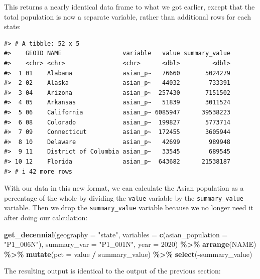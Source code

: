 \documentclass[
]{book}
\newenvironment{Shaded}{\begin{snugshade}}{\end{snugshade}}
\newcommand{\AttributeTok}[1]{\textcolor[rgb]{0.13,0.29,0.53}{#1}}
\newcommand{\DecValTok}[1]{\textcolor[rgb]{0.00,0.00,0.81}{#1}}
\newcommand{\FunctionTok}[1]{\textcolor[rgb]{0.13,0.29,0.53}{\textbf{#1}}}
\newcommand{\NormalTok}[1]{#1}
\newcommand{\SpecialCharTok}[1]{\textcolor[rgb]{0.81,0.36,0.00}{\textbf{#1}}}
\newcommand{\StringTok}[1]{\textcolor[rgb]{0.31,0.60,0.02}{#1}}
\begin{document}
This returns a nearly identical data frame to what we got earlier, except that the total population is now a separate variable, rather than additional rows for each state:

\begin{verbatim}
#> # A tibble: 52 x 5
#>    GEOID NAME                 variable   value summary_value
#>    <chr> <chr>                <chr>      <dbl>         <dbl>
#>  1 01    Alabama              asian_p~   76660       5024279
#>  2 02    Alaska               asian_p~   44032        733391
#>  3 04    Arizona              asian_p~  257430       7151502
#>  4 05    Arkansas             asian_p~   51839       3011524
#>  5 06    California           asian_p~ 6085947      39538223
#>  6 08    Colorado             asian_p~  199827       5773714
#>  7 09    Connecticut          asian_p~  172455       3605944
#>  8 10    Delaware             asian_p~   42699        989948
#>  9 11    District of Columbia asian_p~   33545        689545
#> 10 12    Florida              asian_p~  643682      21538187
#> # i 42 more rows
\end{verbatim}

With our data in this new format, we can calculate the Asian population as a percentage of the whole by dividing the \texttt{value} variable by the \texttt{summary\_value} variable. Then we drop the \texttt{summary\_value} variable because we no longer need it after doing our calculation:

\begin{Shaded}
\begin{Highlighting}[]
\FunctionTok{get\_decennial}\NormalTok{(}\AttributeTok{geography =} \StringTok{"state"}\NormalTok{, }
              \AttributeTok{variables =} \FunctionTok{c}\NormalTok{(}\AttributeTok{asian\_population =} \StringTok{"P1\_006N"}\NormalTok{),}
              \AttributeTok{summary\_var =} \StringTok{"P1\_001N"}\NormalTok{,}
              \AttributeTok{year =} \DecValTok{2020}\NormalTok{) }\SpecialCharTok{\%\textgreater{}\%} 
  \FunctionTok{arrange}\NormalTok{(NAME) }\SpecialCharTok{\%\textgreater{}\%} 
  \FunctionTok{mutate}\NormalTok{(}\AttributeTok{pct =}\NormalTok{ value }\SpecialCharTok{/}\NormalTok{ summary\_value) }\SpecialCharTok{\%\textgreater{}\%} 
  \FunctionTok{select}\NormalTok{(}\SpecialCharTok{{-}}\NormalTok{summary\_value)}
\end{Highlighting}
\end{Shaded}

The resulting output is identical to the output of the previous section:
\end{document}
